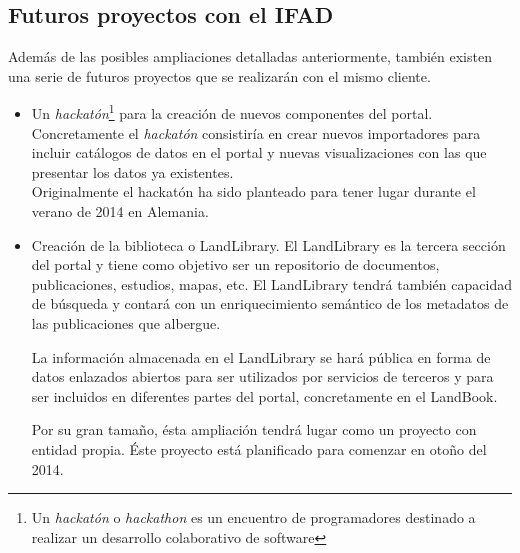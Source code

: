 \subsection{Futuros proyectos con el IFAD}
	Además de las posibles ampliaciones detalladas anteriormente, también existen una
	serie de futuros proyectos que se realizarán con el mismo cliente.
	\begin{itemize}
		\item Un \textit{hackatón}\footnote{Un \textit{hackatón} o \textit{hackathon} es un encuentro de programadores destinado a realizar un desarrollo colaborativo de software} para la creación de nuevos componentes del portal.  Concretamente
		el \textit{hackatón} consistiría en crear nuevos importadores para incluir catálogos de
		datos en el portal y nuevas visualizaciones con las que presentar los datos
		ya existentes.\\
		Originalmente el hackatón ha sido planteado para tener lugar durante el verano
		de 2014 en Alemania.
		
		\item Creación de la biblioteca o LandLibrary.  El LandLibrary es la tercera
		sección del portal y tiene como objetivo ser un repositorio de documentos,
		publicaciones, estudios, mapas, etc.  El LandLibrary tendrá también	capacidad
		de búsqueda y contará con un enriquecimiento semántico de los metadatos de
		las publicaciones que albergue.
		
		La información almacenada en el LandLibrary se hará pública en forma de
		datos enlazados abiertos para ser utilizados por servicios de terceros y 
		para ser incluidos en diferentes partes del portal, concretamente en el
		LandBook.
		
		Por su gran tamaño, ésta ampliación tendrá lugar como un proyecto con
		entidad propia.  Éste proyecto está planificado para comenzar en otoño
		del 2014.
		
	\end{itemize}

